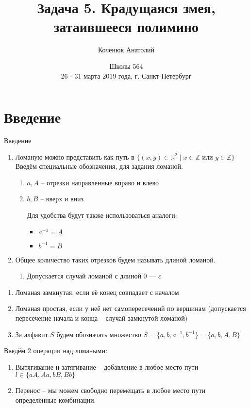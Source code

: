 \documentclass[serif, ucs]{beamer}
\title[Крадущаяся змея, затаившееся полимино]{Задача 5. Крадущаяся змея, \newline затаившееся полимино}
\author[VII Санкт-Петербургский Турнир юных математиков]{Коченюк Анатолий}
\date{Школы 564 \\ \vspace{5mm} 26 - 31 марта 2019 года, г. Санкт-Петербург}
\begin{document}
\begin{frame}
\titlepage
\end{frame}

\section[Введение]{Введение}

\begin{frame}{Введение}
	\begin{small}
	\begin{enumerate}
	\item Ломаную можно представить как путь в $\{(x, y)\in\mathds{R}^2\mid x\in \mathds{Z} \text{ или } y\in\mathds{Z}\}$
	Введём специальные обозначения, для задания ломаной.
	\begin{enumerate}
		\item[] $a, A$ -- отрезки направленные вправо и влево
		\item[] $b, B$ -- вверх и вниз
		
		Для удобства будут также использоваться аналоги:
		\begin{itemize}
			\item $a^{-1} = A$
			\item $b^{-1} = B$
		\end{itemize}
	\end{enumerate}
	\item Общее количество таких отрезков будем называть длиной ломаной.
	\begin{enumerate}
		\item []Допускается случай ломаной с длиной 0 --- $\varepsilon$
	\end{enumerate}
	\end{enumerate}	
	\end{small}
	
\end{frame}

\begin{frame}
\begin{enumerate}
	\item Ломаная замкнутая, если её конец совпадает с началом
	\item Ломаная простая, если у неё нет самопересечений по вершинам (допускается пересечение начала и конца -- случай замкнутой ломаной)
	\item За алфавит $S$ будем обозначать множество $S = \{a, b, a^{-1}, b^{-1}\} = \{a, b, A, B\}$ 	
\end{enumerate}

Введём 2 операции над ломаными:
\begin{enumerate}
	\item Вытягивание и затягивание -- добавление в любое место пути $l\in\{aA, Aa, bB, Bb\}$
	\item Перенос -- мы можем свободно перемещать в любое место пути определённые комбинации. 
	\end{enumerate}
\end{frame}
\end{document}
